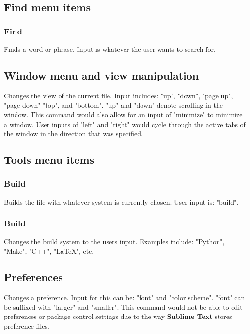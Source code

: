 \documentclass[11pt, oneside]{article}
\begin{document}
\subsection{Find menu items}

	\subsubsection{Find \hfill {}}
	Finds a word or phrase. Input is whatever the user wants to search for.

\subsection{Window menu and view manipulation \hfill {}}
Changes the view of the current file. Input includes: "up", "down", "page up", "page down" "top", and "bottom". "up" and "down" denote scrolling in the window. This command would also allow for an input of "minimize" to minimize a window. User inputs of "left" and "right" would cycle through the active tabs of the window in the direction that was specified.

\subsection{Tools menu items}
		
	\subsubsection{Build \hfill {}}
	Builds the file with whatever system is currently chosen. User input is: "build".

	\subsubsection{Build \hfill {}}
	Changes the build system to the users input. Examples include: "Python", "Make", "C++", "\LaTeX", etc.

\subsection{Preferences \hfill {}}
Changes a preference. Input for this can be: "font" and  "color scheme". "font" can be suffixed with "larger" and "smaller". This command would not be able to edit preferences or package control settings due to the way \textbf{Sublime Text} stores preference files. 
\end{document}
